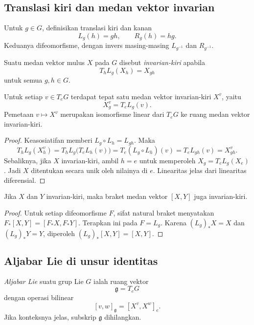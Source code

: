 \subsection{Translasi kiri dan medan vektor invarian}

Untuk $g\in G$, definisikan translasi kiri dan kanan
\[
  L_g(h)=gh,
  \qquad
  R_g(h)=hg.
\]
Keduanya difeomorfisme, dengan invers masing-masing $L_{g^{-1}}$ dan
$R_{g^{-1}}$.

\begin{definition}\label{o011-bl-def-left-invariant}
Suatu medan vektor mulus $X$ pada $G$ disebut \emph{invarian-kiri} apabila
\[
  T_hL_g(X_h)=X_{gh}
\]
untuk semua $g,h\in G$.
\end{definition}

\begin{Proposition}\label{o011-bl-prop-left-invariant-correspondence}
Untuk setiap $v\in T_eG$ terdapat tepat satu medan vektor invarian-kiri
$X^v$, yaitu
\[
  X^v_g=T_eL_g(v).
\]
Pemetaan $v\mapsto X^v$ merupakan isomorfisme linear dari $T_eG$ ke ruang
medan vektor invarian-kiri.
\end{Proposition}

\begin{proof}
Keasosiatifan memberi $L_g\circ L_h=L_{gh}$. Maka
\[
 T_hL_g(X^v_h)
 =T_hL_g\bigl(T_eL_h(v)\bigr)
 =T_e(L_g\circ L_h)(v)
 =T_eL_{gh}(v)=X^v_{gh}.
\]
Sebaliknya, jika $X$ invarian-kiri, ambil $h=e$ untuk memperoleh
$X_g=T_eL_g(X_e)$. Jadi $X$ ditentukan secara unik oleh nilainya di $e$.
Linearitas jelas dari linearitas diferensial.
\end{proof}

\begin{Proposition}\label{o011-bl-prop-invariant-bracket}
Jika $X$ dan $Y$ invarian-kiri, maka braket medan vektor $[X,Y]$ juga
invarian-kiri.
\end{Proposition}

\begin{proof}
Untuk setiap difeomorfisme $F$, sifat natural braket menyatakan
$F_*[X,Y]=[F_*X,F_*Y]$. Terapkan ini pada $F=L_g$. Karena
$(L_g)_*X=X$ dan $(L_g)_*Y=Y$, diperoleh $(L_g)_*[X,Y]=[X,Y]$.
\end{proof}

\subsection{Aljabar Lie di unsur identitas}

\begin{definition}\label{o011-bl-def-lie-algebra}
\emph{Aljabar Lie} suatu grup Lie $G$ ialah ruang vektor
\[
  \mathfrak g=T_eG
\]
dengan operasi bilinear
\[
  [v,w]_{\mathfrak g}=[X^v,X^w]_e.
\]
Jika konteksnya jelas, subskrip $\mathfrak g$ dihilangkan.
\end{definition}

